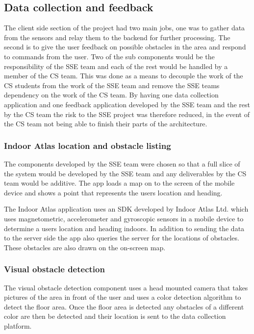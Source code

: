 \documentclass[prodmode,acmtosem]{acmsmall} %
\begin{document}
\subsection{Data collection and feedback}
The client side section of the project had two main jobs, one was to gather data from the sensors and relay them to the backend for further processing. The second is to give the user feedback on possible obstacles in the area and respond to commands from the user. Two of the sub components would be the responsibility of the SSE team and each of the rest would be handled by a member of the CS team. This was done as a means to decouple the work of the CS students from the work of the SSE team and remove the SSE teams dependency on the work of the CS team. By having one data collection application and one feedback application developed by the SSE team and the rest by the CS team the risk to the SSE project was therefore reduced, in the event of the CS team not being able to finish their parts of the architecture.

\subsubsection{Indoor Atlas location and obstacle listing}
The components developed by the SSE team were chosen so that a full slice of the system would be developed by the SSE team and any deliverables by the CS team would be additive. The app loads a map on to the screen of the mobile device and shows a point that represents the users location and heading.

The Indoor Atlas application uses an SDK developed by Indoor Atlas Ltd. \cite{IndoorAtlas} which uses magnetometric, accelerometer and gyroscopic sensors in a mobile device to determine a users location and heading indoors. In addition to sending the data to the server side the app also queries the server for the locations of obstacles. These obstacles are also drawn on the on-screen map.

\subsubsection{Visual obstacle detection}
The visual obstacle detection component uses a head mounted camera that takes pictures of the area in front of the user and uses a color detection algorithm to detect the floor area. Once the floor area is detected any obstacles of a different color are then be detected and their location is sent to the data collection platform.
\end{document}
